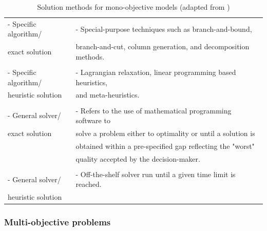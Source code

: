 \documentclass[11pt,3p]{elsarticle}
\begin{document}
\begin{table}[!htbp]
\centering
\caption{Solution methods for mono-objective models (adapted from \citet{melo2009facility})}
\label{tab:SolutionMono}
\begin{tabular}{ll}
\hline
 - Specific algorithm/ &  - Special-purpose techniques such as branch-and-bound,         \\
exact solution      & branch-and-cut, column generation, and decomposition methods. \\
                    &                                                               \\
 - Specific algorithm/ &  - Lagrangian relaxation, linear programming based heuristics,   \\
heuristic solution  & and meta-heuristics.                                           \\
                    &                                                               \\
 - General solver/     &  - Refers to the use of mathematical programming software to    \\
exact solution      & solve a problem either to optimality or until a solution is   \\
                    & obtained within a pre-specified gap reflecting the "worst"    \\
                    & quality accepted by the decision-maker.                       \\
                    &                                                               \\
 - General solver/     &  - Off-the-shelf solver run until a given time limit is reached. \\
heuristic solution  &                                                               \\ \hline
\end{tabular}
\end{table}

\subsubsection{Multi-objective problems}
\end{document}

